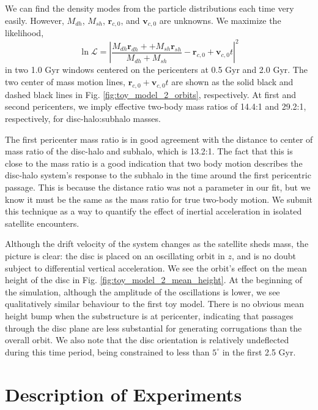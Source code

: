 We can find the density modes from the particle distributions each time very easily. However, $M_{dh}$, $M_{sh}$, $\textbf{r}_{c,0}$, and $\textbf{v}_{c,0}$ are unknowns. We maximize the likelihood,
\begin{equation}
\ln \mathcal{L} = \left\vert \frac{M_{dh}\textbf{r}_{dh} +  + M_{sh} \textbf{r}_{sh}}{M_{dh} + M_{sh}} - \textbf{r}_{c,0} + \textbf{v}_{c,0} t \right\vert^2
\end{equation}
in two 1.0 Gyr windows centered on the pericenters at 0.5 Gyr and 2.0 Gyr. The two center of mass motion lines, $\textbf{r}_{c,0} + \textbf{v}_{c,0} t$ are shown as the solid black and dashed black lines in Fig. \ref{fig:toy_model_2_orbits}, respectively. At first and second pericenters, we imply effective two-body mass ratios of 14.4:1 and 29.2:1, respectively, for disc-halo:subhalo masses. 

The first pericenter mass ratio is in good agreement with the distance to center of mass ratio of the disc-halo and subhalo, which is 13.2:1. The fact that this is close to the mass ratio is a good indication that two body motion describes the disc-halo system's response to the subhalo in the time around the first pericentric passage. This is because the distance ratio was not a parameter in our fit, but we know it must be the same as the mass ratio for true two-body motion. We submit this technique as a way to quantify the effect of inertial acceleration in isolated satellite encounters.

Although the drift velocity of the system changes as the satellite sheds mass, the picture is clear: the disc is placed on an oscillating orbit in $z$, and is no doubt subject to differential vertical acceleration. 
We see the orbit's effect on the mean height of the disc in Fig. \ref{fig:toy_model_2_mean_height}. At the beginning of the simulation, although the amplitude of the oscillations is lower, we see qualitatively similar behaviour to the first toy model. There is no obvious mean height bump when the substructure is at pericenter, indicating that passages through the disc plane are less substantial for generating corrugations than the overall orbit. We also note that the disc orientation is relatively undeflected during this time period, being constrained to less than $5^{\circ}$ in the first 2.5 Gyr.




\section{Description of Experiments} \label{sec:description}


